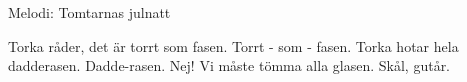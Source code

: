 \begin{song}

\begin{songmeta}
Melodi: Tomtarnas julnatt
\end{songmeta}

\begin{songtext}
Torka råder, det är torrt som fasen.
Torrt - som - fasen.
Torka hotar hela dadderasen.
Dadde-rasen.
Nej! Vi måste tömma alla glasen.
Skål, gutår.
\end{songtext}
\end{song}
